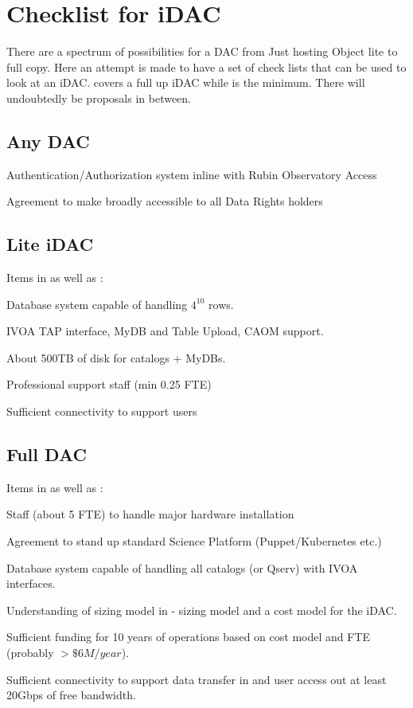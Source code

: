 
\section{Checklist for iDAC}\label{sec:checklist}

There are a spectrum of possibilities for a DAC from Just hosting Object lite to full copy.
Here an attempt is made to have a set of check lists  that can be used to look at an iDAC.
 covers a full up iDAC while   is the minimum.
There will undoubtedly be proposals in between.

\subsection{Any DAC} \label{sec:anyDAC}
\begin{todolist}
\item Authentication/Authorization system  inline with Rubin Observatory Access
\item Agreement to make broadly accessible to all Data Rights holders
\end{todolist}

\subsection{Lite iDAC} \label{sec:liteDAC}
Items in  as well as :
\begin{todolist}
\item Database system capable of handling $4^{10}$ rows.
\item IVOA TAP interface, MyDB and Table Upload, CAOM support.
\item About 500TB of disk for catalogs + MyDBs.
\item Professional support staff (min 0.25 FTE)
\item Sufficient connectivity to support users
\end{todolist}

\subsection{Full DAC} \label{sec:fullDAC}
Items in  as well as :
\begin{todolist}
\item Staff (about 5 FTE) to handle major hardware installation
\item Agreement to stand up standard Science Platform (Puppet/Kubernetes etc.)
\item Database system capable of handling all catalogs (or Qserv) with IVOA  interfaces.
\item Understanding of sizing model in  - sizing model and a cost model for the iDAC.
\item Sufficient funding for 10 years of operations  based on cost model and FTE (probably $>\$6M/year$).
\item Sufficient connectivity to support data transfer in and user access out at least 20Gbps of free bandwidth.
\end{todolist}
